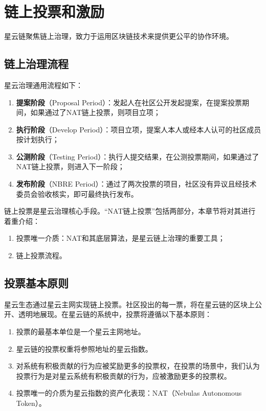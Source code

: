 \section{链上投票和激励}

星云链聚焦链上治理，致力于运用区块链技术来提供更公平的协作环境。

\subsection{链上治理流程}
\label{governance}

星云治理通用流程如下：

\begin{enumerate}
	\item \textbf{提案阶段}（Proposal Period）：发起人在社区公开发起提案，在提案投票期间，如果通过了NAT链上投票，则项目立项；
	\item \textbf{执行阶段}（Develop Period）：项目立项，提案人本人或经本人认可的社区成员按计划执行；
	\item \textbf{公测阶段}（Testing Period）：执行人提交结果，在公测投票期间，如果通过了NAT链上投票，则进入下一阶段；
	\item \textbf{发布阶段}（NBRE Period）：通过了两次投票的项目，社区没有异议且经技术委员会验收核实，即可最终执行发布。
\end{enumerate}

链上投票是星云治理核心手段。“NAT链上投票”包括两部分，本章节将对其进行着重介绍：

\begin{enumerate}
	\item 投票唯一介质：NAT和其底层算法，是星云链上治理的重要工具；
	\item 链上投票流程。
\end{enumerate}

\subsection{投票基本原则}

星云生态通过星云主网实现链上投票。社区投出的每一票，将在星云链的区块上公开、透明地展现。在星云链的系统中，投票将遵循以下基本原则：

\begin{enumerate}
	\item 投票的最基本单位是一个星云主网地址。
	\item 星云链的投票权重将参照地址的星云指数。
	\item 对系统有积极贡献的行为应被奖励更多的投票权，在投票的场景中，我们认为投票行为是对星云系统有积极贡献的行为，应被激励更多的投票权。
	\item 投票唯一的介质为星云指数的资产化表现：NAT（Nebulas Autonomous Token）。
\end{enumerate}


